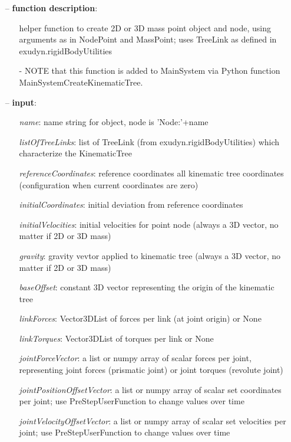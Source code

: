 \begin{itemize}[leftmargin=0.7cm]
\item[--]
{\bf function description}: \vspace{-6pt}
\begin{itemize}[leftmargin=1.2cm]
\setlength{\itemindent}{-0.7cm}
\item[]helper function to create 2D or 3D mass point object and node, using arguments as in NodePoint and MassPoint; uses TreeLink as defined in exudyn.rigidBodyUtilities
\item[]- NOTE that this function is added to MainSystem via Python function MainSystemCreateKinematicTree.
\end{itemize}
\item[--]
{\bf input}: \vspace{-6pt}
\begin{itemize}[leftmargin=1.2cm]
\setlength{\itemindent}{-0.7cm}
\item[]{\it name}: name string for object, node is 'Node:'+name
\item[]{\it listOfTreeLinks}: list of TreeLink (from exudyn.rigidBodyUtilities) which characterize the KinematicTree
\item[]{\it referenceCoordinates}: reference coordinates all kinematic tree coordinates (configuration when current coordinates are zero)
\item[]{\it initialCoordinates}: initial deviation from reference coordinates
\item[]{\it initialVelocities}: initial velocities for point node (always a 3D vector, no matter if 2D or 3D mass)
\item[]{\it gravity}: gravity vevtor applied to kinematic tree (always a 3D vector, no matter if 2D or 3D mass)
\item[]{\it baseOffset}: constant 3D vector representing the origin of the kinematic tree
\item[]{\it linkForces}: Vector3DList of forces per link (at joint origin) or None
\item[]{\it linkTorques}: Vector3DList of torques per link or None
\item[]{\it jointForceVector}: a list or numpy array of scalar forces per joint, representing joint forces (prismatic joint) or joint torques (revolute joint)
\item[]{\it jointPositionOffsetVector}: a list or numpy array of scalar set coordinates per joint; use PreStepUserFunction to change values over time
\item[]{\it jointVelocityOffsetVector}: a list or numpy array of scalar set velocities per joint; use PreStepUserFunction to change values over time

\end{itemize}
\end{itemize}
